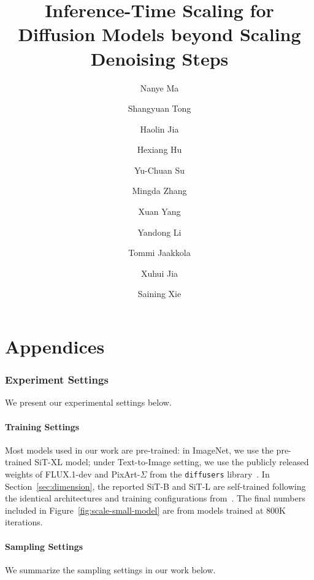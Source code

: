 \documentclass[11pt, letterpaper, logo]{googledeepmind}
\title{Inference-Time Scaling for Diffusion Models beyond Scaling Denoising Steps}
\author[$\vardiamondsuit$, $\clubsuit$, 1]{Nanye Ma}
\author[$\vardiamondsuit$, $\clubsuit$, 2]{Shangyuan Tong}
\author[3]{Haolin Jia}
\author[3]{Hexiang Hu}
\author[3]{Yu-Chuan Su}
\author[3]{Mingda Zhang}
\author[3]{Xuan Yang}
\author[3]{Yandong Li}
\author[2]{Tommi Jaakkola}
\author[3]{Xuhui Jia}
\author[1,3]{Saining Xie}
\affil[$\vardiamondsuit$]{Equal contribution}
\affil[1]{NYU}
\affil[2]{MIT}
\affil[3]{Google}
\affil[$\clubsuit$]{Work done during an internship at Google}
\begin{document}
\maketitle




\nobibliography*


\newpage 

\appendix 
\part*{Appendices}

\section{Experiment Settings}
\label{app:sec:exp-setting}

We present our experimental settings below.

\vspace{-0.25cm}
\subsection{Training Settings}

Most models used in our work are pre-trained: in ImageNet, we use the pre-trained SiT-XL model; under Text-to-Image setting, we use the publicly released weights of FLUX.1-dev and PixArt-$\Sigma$ from the \texttt{diffusers} library~\citep{von-platen-etal-2022-diffusers}. In Section~\ref{sec:dimension}, the reported SiT-B and SiT-L are self-trained following the identical architectures and training configurations from~\citep{ma2024sit}. The final numbers included in Figure~\ref{fig:scale-small-model} are from models trained at 800K iterations.

\vspace{-0.25cm}
\subsection{Sampling Settings}

We summarize the sampling settings in our work below.
\end{document}
